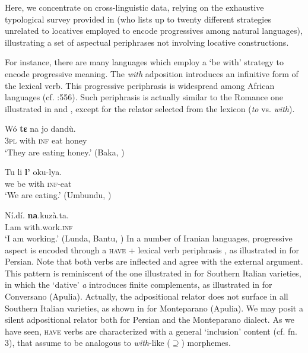 \documentclass[output=paper,modfonts,nonflat,newtxmath,colorlinks,citecolor=brown]{langsci/langscibook}
\begin{document}
Here, we concentrate on cross-linguistic data, relying on the exhaustive typological survey provided in \citet{Cinque2017} (who lists up to twenty different strategies unrelated to locatives employed to encode progressives among natural languages), illustrating a set of aspectual periphrases not involving locative constructions.

For instance, there are many languages which employ a ‘be with’ strategy to encode progressive meaning. The \textit{with} adposition introduces an infinitive form of the lexical verb. This progressive periphrasis is widespread among African languages (cf. \citealt{Cinque2017}:556). Such periphrasis is actually similar to the Romance one illustrated in  and , except for the relator selected from the lexicon (\textit{to} vs. \textit{with}).

\ea%
    \label{ex:franco:12}
    \gll Wó  \textbf{tε}   na   jo   dandù.\\
        3\textsc{pl}  with   \textsc{inf}   eat   honey\\
    \glt ‘They are eating honey.’   (Baka, \citealt[29]{Kilian-Hatz1992})
    \z

\ea%
    \label{ex:franco:13}
    \gll Tu   li   \textbf{l’}   oku-lya. \\
        we  be  with  \textsc{inf}-eat\\
    \glt ‘We are eating.’  (Umbundu, \citealt[83]{HeineKuteva2002})
    \z

\ea%
    \label{ex:franco:14}
    \gll Ní.dí.   \textbf{na}.kuzà.ta.\\
        I.am  with.work.\textsc{inf}  \\
    \glt ‘I am working.’    (Lunda, Bantu, \citealt[194]{Kawasha2003})
    \z
In a number of Iranian languages, progressive aspect is encoded through a \textsc{have} + lexical verb periphrasis \citep[556]{Cinque2017}, as illustrated in  for Persian. Note that both verbs are inflected and agree with the external argument. This pattern is reminiscent of the one illustrated in \citet{ManziniEtAl2017} for Southern Italian varieties, in which the ‘dative’ \textit{a} introduces finite complements, as illustrated in  for Conversano (Apulia). Actually, the adpositional relator does not surface in all Southern Italian varieties, as shown in  for Monteparano (Apulia). We may posit a silent adpositional relator \citep{Kayne2003} both for Persian and the Monteparano dialect. As we have seen, \textsc{have} verbs are characterized with a general ‘inclusion’ content (cf. fn. 3), that \citet{ManziniFranco2016} assume to be analogous to \textit{with}{}-like (${\supseteq}$) morphemes.
\end{document}
